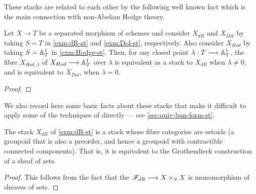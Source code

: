 \documentclass[11pt]{amsart}
\begin{document}
These stacks are related to each other by the following well known fact which
is the main connection with non-Abelian Hodge theory.

\begin{prop}
Let $X \to T$ be a separated morphism of schemes and consider
$X_{dR}$ and $X_{Dol}$ by taking $S = T$ in \cref{exm:dR-st} and
\cref{exm:Dol-st}, respectively.
Also consider $X_{Hod}$ by taking $S = \mathbb{A}^1_T$ in
\cref{exm:Hodge-st}. Then, for any closed point $\lambda : T \to \bA^1_T$,
the fibre $X_{Hod, \lambda}$ of $X_{Hod} \to \bA^{1}_T$ over $\lambda$ is
equivalent as a stack to $X_{dR}$ when $\lambda \neq 0$, and is equivalent to
$X_{Dol}$, when $\lambda = 0$.
\end{prop}
\begin{proof}
\end{proof}

We also record here some basic facts about these stacks that make it difficult
to apply some of the techniques of \cite{ModQuivBun} directly ---
see \cref{sec:quiv-bun-form-st}.

\begin{cor}\label{prop:dR-st-set-fibres}
The stack $X_{dR}$ of \cref{exm:dR-st} is a stack whose fibre categories are
setoids (a groupoid that is also a preorder, and hence a groupoid with
contractible connected components). That is, it is equivalent to the
Grothendieck construction of a sheaf of sets.
\end{cor}
\begin{proof}
This follows from the fact that the $\sF_{dR} \to X \times_S X$ is monomorphism
of sheaves of sets.
\end{proof}
\end{document}
